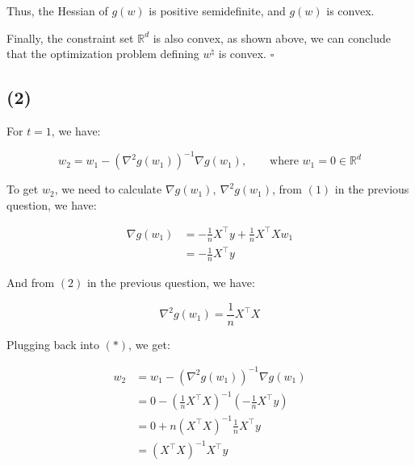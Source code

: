\documentclass{article}
\begin{document}
Thus, the Hessian of $g(w)$ is positive semidefinite, and $g(w)$ is convex. 
\bigskip

Finally, the constraint set $\mathbb{R}^d$ is also convex, as shown above,
we can conclude that the optimization problem defining $w^\natural$ is convex. $\square$

\subsection*{(2)}

For $t=1$, we have:

\begin{equation*}
    w_2 = w_1 - \left( \nabla^2 g ( w_1 ) \right)^{-1} \nabla g ( w_1 ), 
    \qquad \text{where } w_1 = 0 \in \mathbb{R}^d \tag{*}
\end{equation*}
\newpage

To get $w_2$, we need to calculate $\nabla g ( w_1 ), \ \nabla^2 g ( w_1 )$,
from $(1)$ in the previous question, we have:

\begin{equation*}
    \begin{split}
        \nabla g ( w_1 ) 
            &= - \frac{1}{n} X^\intercal y + \frac{1}{n} X^\intercal Xw_1 \\
            &= - \frac{1}{n} X^\intercal y
    \end{split}
\end{equation*}

And from $(2)$ in the previous question, we have:

\begin{equation*}
    \nabla^2 g ( w_1 ) = \frac{1}{n} X^\intercal X
\end{equation*}
    
Plugging back into $(*)$, we get:

\begin{equation*}
    \begin{split}
        w_2 
            &= w_1 - \left( \nabla^2 g ( w_1 ) \right)^{-1} \nabla g ( w_1 ) \\
            &= 0 - \left( \frac{1}{n} X^\intercal X \right)^{-1} \left( - \frac{1}{n} X^\intercal y \right) \\
            &= 0 + n (X^\intercal X)^{-1} \frac{1}{n} X^\intercal y \\
            &= (X^\intercal X)^{-1} X^\intercal y 
    \end{split} \tag{1}  
\end{equation*}
\end{document}

